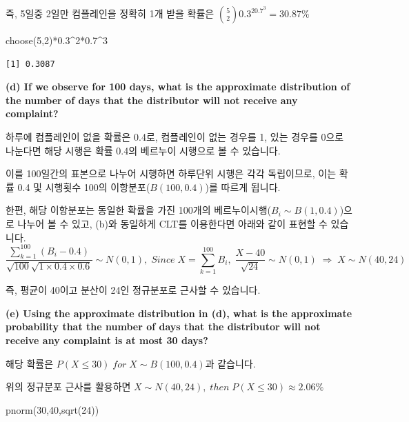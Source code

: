 \documentclass[
  letterpaper,
  DIV=11,
  numbers=noendperiod]{scrreprt}
\newenvironment{Shaded}{\begin{snugshade}}{\end{snugshade}}
\newcommand{\DecValTok}[1]{\textcolor[rgb]{0.68,0.00,0.00}{#1}}
\newcommand{\FloatTok}[1]{\textcolor[rgb]{0.68,0.00,0.00}{#1}}
\newcommand{\FunctionTok}[1]{\textcolor[rgb]{0.28,0.35,0.67}{#1}}
\newcommand{\NormalTok}[1]{\textcolor[rgb]{0.00,0.23,0.31}{#1}}
\newcommand{\SpecialCharTok}[1]{\textcolor[rgb]{0.37,0.37,0.37}{#1}}
\begin{document}
즉, 5일중 2일만 컴플레인을 정확히 1개 받을 확률은
\({5\choose2}0.3^20.7^3=30.87\%\)

\begin{Shaded}
\begin{Highlighting}[]
\FunctionTok{choose}\NormalTok{(}\DecValTok{5}\NormalTok{,}\DecValTok{2}\NormalTok{)}\SpecialCharTok{*}\FloatTok{0.3}\SpecialCharTok{\^{}}\DecValTok{2}\SpecialCharTok{*}\FloatTok{0.7}\SpecialCharTok{\^{}}\DecValTok{3}
\end{Highlighting}
\end{Shaded}

\begin{verbatim}
[1] 0.3087
\end{verbatim}

\textbf{(d) If we observe for 100 days, what is the approximate
distribution of the number of days that the distributor will not receive
any complaint?}

하루에 컴플레인이 없을 확률은 0.4로, 컴플레인이 없는 경우를 1, 있는
경우를 0으로 나눈다면 해당 시행은 확률 0.4의 베르누이 시행으로 볼 수
있습니다.

이를 100일간의 표본으로 나누어 시행하면 하루단위 시행은 각각 독립이므로,
이는 확률 0.4 및 시행횟수 100의 이항분포(\(B(100,0.4)\))를 따르게
됩니다.

한편, 해당 이항분포는 동일한 확률을 가진 100개의
베르누이시행(\(B_i\sim B(1,0.4)\))으로 나누어 볼 수 있고, (b)와 동일하게
CLT를 이용한다면 아래와 같이 표현할 수 있습니다.
\[\frac{\sum_{k=1}^{100}(B_i-0.4)}{\sqrt{100}\sqrt{1\times 0.4 \times 0.6}}\sim N(0,1),\;Since\;X=\sum_{k=1}^{100}B_i,\;\frac{X-40}{\sqrt{24}}\sim N(0,1)\;\Rightarrow\;X\sim N(40,24)\]

즉, 평균이 40이고 분산이 24인 정규분포로 근사할 수 있습니다.

\textbf{(e) Using the approximate distribution in (d), what is the
approximate probability that the number of days that the distributor
will not receive any complaint is at most 30 days?}

해당 확률은 \(P(X\leq 30)\;for\;X\sim B(100,0.4)\)과 같습니다.

위의 정규분포 근사를 활용하면
\(X\sim N(40,24),\;then\;P(X\leq 30)\approx 2.06\%\)

\begin{Shaded}
\begin{Highlighting}[]
\FunctionTok{pnorm}\NormalTok{(}\DecValTok{30}\NormalTok{,}\DecValTok{40}\NormalTok{,}\FunctionTok{sqrt}\NormalTok{(}\DecValTok{24}\NormalTok{))}
\end{Highlighting}
\end{Shaded}
\end{document}
